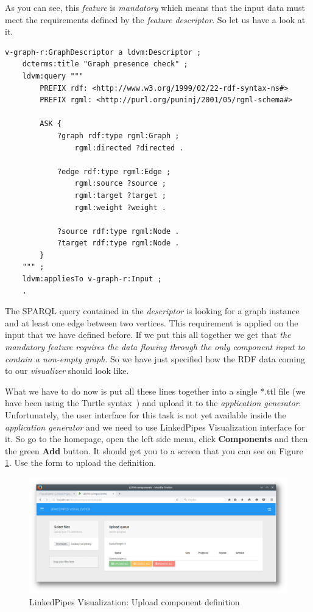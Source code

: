 As you can see, this \emph{feature} is \emph{mandatory} which means that the input data must meet the requirements defined by the \emph{feature descriptor}. So let us have a look at it.

\scriptsize
\begin{verbatim}
v-graph-r:GraphDescriptor a ldvm:Descriptor ;
    dcterms:title "Graph presence check" ;
    ldvm:query """
        PREFIX rdf: <http://www.w3.org/1999/02/22-rdf-syntax-ns#>
        PREFIX rgml: <http://purl.org/puninj/2001/05/rgml-schema#>

        ASK {
            ?graph rdf:type rgml:Graph ;
                rgml:directed ?directed .

            ?edge rdf:type rgml:Edge ;
                rgml:source ?source ;
                rgml:target ?target ;
                rgml:weight ?weight .

            ?source rdf:type rgml:Node .
            ?target rdf:type rgml:Node .
        }
    """ ;
    ldvm:appliesTo v-graph-r:Input ;
    .
\end{verbatim}
\normalsize

The SPARQL query contained in the \emph{descriptor} is looking for a graph instance and at least one edge between two vertices. This requirement is applied on the input that we have defined before. If we put this all together we get that \textit{the \emph{mandatory feature} requires the data flowing through the only \emph{component input} to contain a non-empty graph}. So we have just specified how the RDF data coming to our \emph{visualizer} should look like.

What we have to do now is put all these lines together into a single *.ttl file (we have been using the Turtle syntax~\cite{turtle}) and upload it to the \emph{application generator}. Unfortunately, the user interface for this task is not yet available inside the \emph{application generator} and we need to use LinkedPipes Visualization interface for it. So go to the homepage, open the left side menu, click \textbf{Components} and then the green \textbf{Add} button. It should get you to a screen that you can see on Figure \ref{fig:upload_component_definition}. Use the form to upload the definition.

\begin{figure}
	\centering
	\includegraphics[width=145mm]{img/05_upload_component_definition.png}
	\caption{LinkedPipes Visualization: Upload component definition}
    \label{fig:upload_component_definition}
\end{figure}

